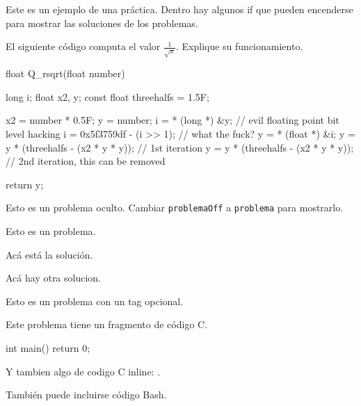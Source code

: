 \documentclass[practica]{lcc}
\begin{document}
\maketitle

Este es un ejemplo de una práctica. Dentro hay algunos if que pueden
encenderse para mostrar las soluciones de los problemas.

\begin{problema}
    El siguiente código computa el valor $\frac{1}{\sqrt{x}}$. Explique
    su funcionamiento.
    \begin{C}
float Q_rsqrt(float number)
{
    long i;
    float x2, y;
    const float threehalfs = 1.5F;

    x2 = number * 0.5F;
    y  = number;
    i  = * (long *) &y;                   // evil floating point bit level hacking
    i  = 0x5f3759df - (i >> 1);           // what the fuck?
    y  = * (float *) &i;
    y  = y * (threehalfs - (x2 * y * y)); // 1st iteration
    y  = y * (threehalfs - (x2 * y * y)); // 2nd iteration, this can be removed

    return y;
}
    \end{C}
\end{problema}

\begin{problemaOff}
    Esto es un problema oculto. Cambiar \texttt{problemaOff} a
    \texttt{problema} para mostrarlo.
\end{problemaOff}

\begin{problema}
    Esto es un problema.
    \begin{solucion}
        Acá está la solución.
    \end{solucion}
    \begin{solucion}[variante 2]
        Acá hay otra solucion.
    \end{solucion}
\end{problema}

\begin{problema}[(díficil)]
    Esto es un problema con un tag opcional.
\end{problema}

\begin{problema}
    Este problema tiene un fragmento de código C.
    \begin{C}
int main()
{
    return 0;
}
    \end{C}
    Y tambien algo de codigo C inline: .
\end{problema}

\begin{problema}
    También puede incluirse código Bash.
\end{problema}
\end{document}
